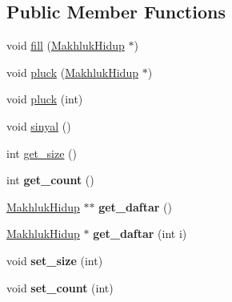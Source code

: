 \subsection*{Public Member Functions}
\begin{DoxyCompactItemize}
\item 
void \hyperlink{class_administrator_makhluk_hidup_a73f1c4f851ace0e6e5d4dda99ca1a963}{fill} (\hyperlink{class_makhluk_hidup}{Makhluk\+Hidup} $\ast$)
\item 
void \hyperlink{class_administrator_makhluk_hidup_a0766cdee6be5104128c72a6ddbc6de19}{pluck} (\hyperlink{class_makhluk_hidup}{Makhluk\+Hidup} $\ast$)
\item 
void \hyperlink{class_administrator_makhluk_hidup_a5faae20a3dfedeab6432ab0a251a7533}{pluck} (int)
\item 
void \hyperlink{class_administrator_makhluk_hidup_a9c62c4de8062108c6e7f08fc685c1e12}{sinyal} ()
\item 
int \hyperlink{class_administrator_makhluk_hidup_aa3da88881045da27c9fcb469215bce70}{get\+\_\+size} ()
\item 
int {\bfseries get\+\_\+count} ()\hypertarget{class_administrator_makhluk_hidup_a69edc3e32e43b014497a543a1e8bc1b9}{}\label{class_administrator_makhluk_hidup_a69edc3e32e43b014497a543a1e8bc1b9}

\item 
\hyperlink{class_makhluk_hidup}{Makhluk\+Hidup} $\ast$$\ast$ {\bfseries get\+\_\+daftar} ()\hypertarget{class_administrator_makhluk_hidup_a46d484635e9e2f7d6ef87a84fa4c628f}{}\label{class_administrator_makhluk_hidup_a46d484635e9e2f7d6ef87a84fa4c628f}

\item 
\hyperlink{class_makhluk_hidup}{Makhluk\+Hidup} $\ast$ {\bfseries get\+\_\+daftar} (int i)\hypertarget{class_administrator_makhluk_hidup_aa5b4c827a367d5f533c77cd410f5575a}{}\label{class_administrator_makhluk_hidup_aa5b4c827a367d5f533c77cd410f5575a}

\item 
void {\bfseries set\+\_\+size} (int)\hypertarget{class_administrator_makhluk_hidup_a5181a812a939b545d9e183a20d1bea2f}{}\label{class_administrator_makhluk_hidup_a5181a812a939b545d9e183a20d1bea2f}

\item 
void {\bfseries set\+\_\+count} (int)\hypertarget{class_administrator_makhluk_hidup_ae196f8f31ce2dbe2be9074547e3164a0}{}\label{class_administrator_makhluk_hidup_ae196f8f31ce2dbe2be9074547e3164a0}

\end{DoxyCompactItemize}


